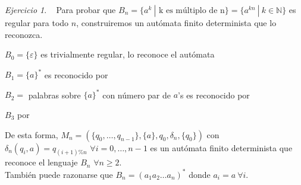 \documentclass[12pt,spanish]{article}
\theoremstyle{definition}
\theoremstyle{remark}
\newtheorem{exercise}{Ejercicio}%
\begin{document}
\begin{exercise}~ Para probar que
  $B_n=\{a^k \ | \text{ k es múltiplo de n}\}=\{a^{kn} \ | \ k \in
  \mathbb{N}\}$ es regular para todo $n$, construiremos un autómata
  finito determinista que lo reconozca.

  $B_0=\{\varepsilon\}$ es trivialmente regular, lo reconoce el autómata \vspace{-5mm}
\begin{figure}[H]
  \centering
\end{figure} \vspace{-5mm}
$B_1=\{a\}^*$ es reconocido por \vspace{-7mm}
\begin{figure}[H]
  \centering
\end{figure}
$B_2=$ palabras sobre $\{a\}^*$ con número par de $a$'s es reconocido por
\begin{figure}[H]
  \centering
\end{figure}

\newpage

$B_3$ por 
\begin{figure}[H]
  \centering
\end{figure}

De esta forma,
$M_n=(\{q_0,\ldots,q_{n-1}\},\{a\},q_0,\delta_n,\{q_0\})$ con
\\ $\delta_n(q_i,a)=q_{(i+1)\%n}$ $\forall i=0,\ldots,n-1$ es un
autómata finito determinista que reconoce el lenguaje $B_n$
$\forall n\geq 2$. \\

También puede razonarse que $B_n=(a_1a_2\ldots a_n)^*$ donde
$a_i=a \ \forall i$.
\end{exercise}
\end{document}
